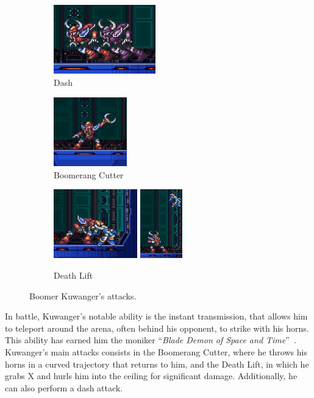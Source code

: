 \begin{figure}[htp]
	\centering
	\begin{subfigure}{0.4\linewidth}
		\centering
		\includegraphics[height=3cm]{figures/X1/Boomer_kuwanger/Boomer_dash.jpg}
		\caption{Dash}
	\end{subfigure}
	\begin{subfigure}{0.4\linewidth}
		\centering
		\includegraphics[height=3cm]{figures/X1/Boomer_kuwanger/Boomer_throw.jpg}
		\caption{Boomerang Cutter}
	\end{subfigure}
	\begin{subfigure}{\linewidth}
		\centering
		\includegraphics[height=3cm]{figures/X1/Boomer_kuwanger/Boomer_lift_1.jpg}
		\includegraphics[height=3cm]{figures/X1/Boomer_kuwanger/Boomer_lift_2.jpg}
		\caption{Death Lift}
	\end{subfigure}
	\caption{Boomer Kuwanger's attacks.}
\end{figure}
In battle, Kuwanger's  notable ability is the instant transmission, that allows him to teleport around the arena, often behind his opponent, to strike with his horns. This ability has earned him the moniker ``\textit{Blade Demon of Space and Time}''~\cite{book:MMX_Complete_art}. Kuwanger's main attacks consists in the Boomerang Cutter, where he throws his horns in a curved trajectory that returns to him, and the Death Lift, in which he grabs X and hurls him into the ceiling for significant damage. Additionally, he can also perform a dash attack.

